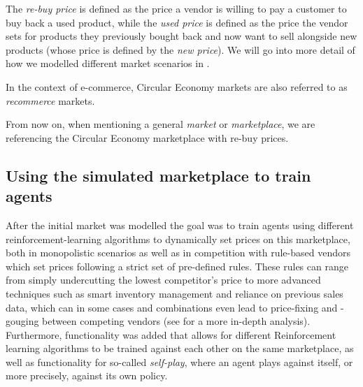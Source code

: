 The \emph{re-buy price} is defined as the price a vendor is willing to pay a customer to buy back a used product, while the \emph{used price} is defined as the price the vendor sets for products they previously bought back and now want to sell alongside new products (whose price is defined by the \emph{new price}). We will go into more detail of how we modelled different market scenarios in .

In the context of e-commerce, Circular Economy markets are also referred to as \emph{recommerce} markets.

From now on, when mentioning a general \emph{market} or \emph{marketplace}, we are referencing the Circular Economy marketplace with re-buy prices.

\subsection*{Using the simulated marketplace to train agents}\label{subsec:ReinforcementLearningIntroduction}

After the initial market was modelled the goal was to train agents using different reinforcement-learning algorithms to dynamically set prices on this marketplace, both in monopolistic scenarios as well as in competition with rule-based vendors which set prices following a strict set of pre-defined rules. These rules can range from simply undercutting the lowest competitor's price to more advanced techniques such as smart inventory management and reliance on previous sales data, which can in some cases and combinations even lead to price-fixing and -gouging between competing vendors (see  for a more in-depth analysis). Furthermore, functionality was added that allows for different Reinforcement learning algorithms to be trained against each other on the same marketplace, as well as functionality for so-called \emph{self-play}, where an agent plays against itself, or more precisely, against its own policy.

